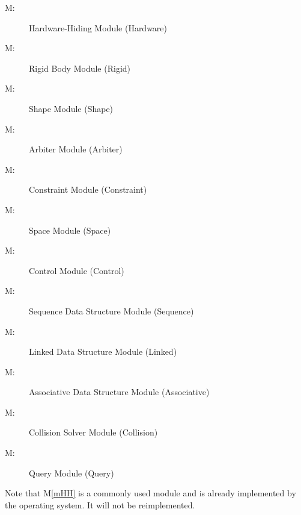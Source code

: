 \documentclass[12pt]{article}
\newcounter{mnum}
\newcommand{\mthemnum}{M\themnum}
\newcommand{\mref}[1]{M\ref{#1}}
\begin{document}
\begin{description}
\item [ \mthemnum \label{mHH}:] Hardware-Hiding Module (Hardware)
\item [ \mthemnum \label{mBody}:] Rigid Body Module (Rigid)
\item [ \mthemnum \label{mShape}:]Shape Module (Shape)
\item [ \mthemnum \label{mCollision}:] Arbiter Module (Arbiter)
\item [ \mthemnum \label{mConstraint}:]  Constraint Module (Constraint)
\item [ \mthemnum \label{mSpace}:] Space Module (Space)
\item [ \mthemnum \label{mControl}:] Control Module (Control)
\item [ \mthemnum \label{mSeqDS}:] Sequence Data Structure Module (Sequence)
\item [ \mthemnum \label{mLinkDS}:] Linked Data Structure Module (Linked) 
\item [ \mthemnum \label{mAssDS}:] Associative Data Structure Module (Associative)
\item [ \mthemnum \label{mSolver}:] Collision Solver Module (Collision)
\item [ \mthemnum \label{mQuery}:] Query Module (Query)
\end{description}

Note that \mref{mHH} is a commonly used module and is already implemented by the operating
system.  It will not be reimplemented.
\end{document}
